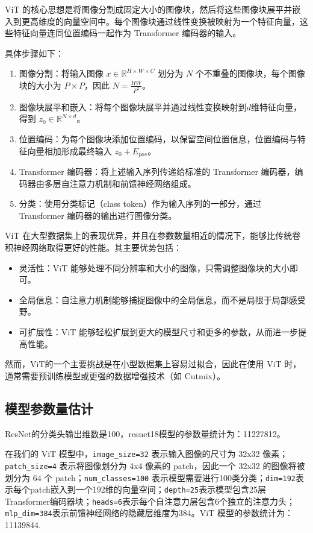 \documentclass[notitlepage,cs4size,punct,oneside]{ctexrep}
\numberwithin{equation}{chapter}
\theoremstyle{mystyle}
\begin{document}
ViT 的核心思想是将图像分割成固定大小的图像块，然后将这些图像块展平并嵌入到更高维度的向量空间中。每个图像块通过线性变换被映射为一个特征向量，这些特征向量连同位置编码一起作为 Transformer 编码器的输入。

具体步骤如下：
\begin{enumerate}
    \item 图像分割：将输入图像 $x \in \mathbb{R}^{H \times W \times C}$ 划分为 $N$ 个不重叠的图像块，每个图像块的大小为 $P \times P$，因此 $N = \frac{HW}{P^2}$。
    \item 图像块展平和嵌入：将每个图像块展平并通过线性变换映射到$d$维特征向量，得到 $z_0 \in \mathbb{R}^{N \times d}$。
    \item 位置编码：为每个图像块添加位置编码，以保留空间位置信息，位置编码与特征向量相加形成最终输入 $z_0 + E_{pos}$。
    \item Transformer 编码器：将上述输入序列传递给标准的 Transformer 编码器，编码器由多层自注意力机制和前馈神经网络组成。
    \item 分类：使用分类标记（class token）作为输入序列的一部分，通过 Transformer 编码器的输出进行图像分类。
\end{enumerate}
ViT 在大型数据集上的表现优异，并且在参数数量相近的情况下，能够比传统卷积神经网络取得更好的性能。其主要优势包括：
\begin{itemize}
    \item 灵活性：ViT 能够处理不同分辨率和大小的图像，只需调整图像块的大小即可。
    \item 全局信息：自注意力机制能够捕捉图像中的全局信息，而不是局限于局部感受野。
    \item 可扩展性：ViT 能够轻松扩展到更大的模型尺寸和更多的参数，从而进一步提高性能。
\end{itemize}
然而，ViT的一个主要挑战是在小型数据集上容易过拟合，因此在使用 ViT 时，通常需要预训练模型或更强的数据增强技术（如 Cutmix）。

\subsection{模型参数量估计}
ResNet的分类头输出维数是100，resnet18模型的参数量统计为：11227812。

在我们的 ViT 模型中，\texttt{image\_size=32} 表示输入图像的尺寸为 32x32 像素；\texttt{patch\_size=4} 表示将图像划分为 4x4 像素的 patch，因此一个 32x32 的图像将被划分为 64 个 patch；\texttt{num\_classes=100} 表示模型需要进行100类分类；\texttt{dim=192}表示每个patch嵌入到一个192维的向量空间；\texttt{depth=25}表示模型包含25层Transformer编码器块；\texttt{heads=6}表示每个自注意力层包含6个独立的注意力头；\texttt{mlp\_dim=384}表示前馈神经网络的隐藏层维度为384。ViT 模型的参数统计为：11139844.
\end{document}
